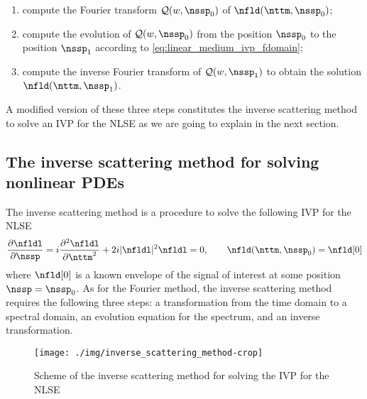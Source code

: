 \begin{enumerate}
 \item compute the Fourier transform $\mathcal{Q}(w,\nssp_0)$ of $\nfld(\nttm,\nssp_0)$;
 \item compute the evolution of $\mathcal{Q}(w,\nssp_0)$ from the position  $\nssp_0$ to the position $\nssp_1$ according to \eqref{eq:linear_medium_ivp_fdomain};
 \item compute the inverse Fourier transform of  $\mathcal{Q}(w,\nssp_1)$ to obtain the solution $\nfld(\nttm,\nssp_1)$.
\end{enumerate}

A modified version of these three steps constitutes the inverse scattering method to solve an \ac{IVP} for the \ac{NLSE} as we are going to explain in the next section.

\subsection{The inverse scattering method for solving nonlinear \aclp{PDE}}
The inverse scattering method is a procedure to solve the following \ac{IVP} for the \ac{NLSE}
\begin{equation}\label{eq:IVP_NLSE}
  \frac{\partial \nfldl}{\partial \nssp} =
    i \frac{\partial^2 \nfldl}{\partial \nttm^2}
    + 2 i |\nfldl|^2 \nfldl = 0, \hspace{0.7cm}
    \nfld(\nttm, \nssp_0) = \nfld[0]
\end{equation}
where $\nfld[0]$ is a known envelope of the signal of interest at some
position $\nssp = \nssp_0$. As for the Fourier method, the inverse scattering method requires the following three steps: a transformation from the time domain to a spectral domain, an evolution equation for the spectrum, and an inverse transformation.

\begin{figure}[t]
  \centering
  \texttt{[image: ./img/inverse\_scattering\_method-crop]}
  \caption{Scheme of the inverse scattering method for solving the \ac{IVP} for the \ac{NLSE}}
  \label{fig:inverse_scattering_method}
\end{figure}


